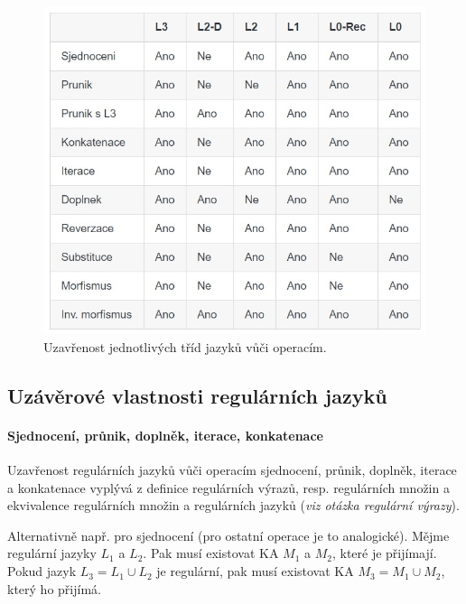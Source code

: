 \begin{figure}[H]
    \centering
    \includegraphics[width=1\linewidth]{uzavrenost_jazyku.png}
    \caption{Uzavřenost jednotlivých tříd jazyků vůči operacím.}
\end{figure}

\subsection{Uzávěrové vlastnosti regulárních jazyků}

\paragraph*{Sjednocení, průnik, doplněk, iterace, konkatenace} \begin{compactitem}
    \item Uzavřenost regulárních jazyků vůči operacím sjednocení, průnik, doplněk, iterace a konkatenace vyplývá z definice regulárních výrazů, resp. regulárních množin a ekvivalence regulárních množin a regulárních jazyků (\textit{viz otázka regulární výrazy}). \begin{compactitem}
        \item Alternativně např. pro sjednocení (pro ostatní operace je to analogické). Mějme regulární jazyky $L_1$ a $L_2$. Pak musí existovat KA $M_1$ a $M_2$, které je přijímají. Pokud jazyk $L_3 = L_1 \cup L_2$ je regulární, pak musí existovat KA $M_3 = M_1 \cup M_2$, který ho přijímá. %
    \end{compactitem}
\end{compactitem}

